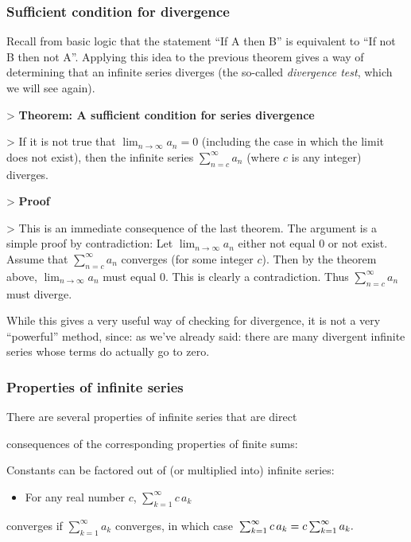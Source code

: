 \subsubsection{Sufficient condition for divergence}
\label{sss:suff-4468}


Recall from basic logic that the statement ``If A then B'' is equivalent to ``If not B then not A''. Applying this idea to the previous theorem gives a way of determining that an infinite series diverges (the so-called \textit{divergence test}, which we will see again).


> \textbf{Theorem: A sufficient condition for series divergence}

> If it is not true that $\lim _{n\to\infty} a_n = 0$ (including the case in which the limit does not exist), then the infinite series $\sum _{n=c}^\infty a_n$ (where $c$ is any integer) diverges.

> \textbf{Proof}

> This is an immediate consequence of the last theorem. The argument is a simple proof by contradiction: Let $\lim _{n\to\infty} a_n$ either not equal 0 or not exist. Assume that $\sum _{n=c}^\infty a_n$ converges (for some integer $c$). Then by the theorem above, $\lim _{n\to\infty} a_n$ must equal 0. This is clearly a contradiction. Thus $\sum _{n=c}^\infty a_n$ must diverge.


While this gives a very useful way of checking for divergence, it is not a very ``powerful'' method, since: as we've already said: there are many divergent infinite series whose terms do actually go to zero.


\subsubsection{Properties of infinite series}
\label{sss:prop-58bd}


There are several properties of infinite series that are direct

consequences of the corresponding properties of finite sums:


Constants can be factored out of (or multiplied into) infinite series:


\begin{itemize}
    \item For any real number $c$, $\textstyle \sum _{k=1}^{\infty} c\,a_k$
\end{itemize}
    converges if $\textstyle \sum _{k=1}^{\infty} a_k$ converges, in which case $\newline \textstyle \sum _{k=1}^{\infty} c\,a_k = c\sum _{k=1}^{\infty}a_k.\newline$

